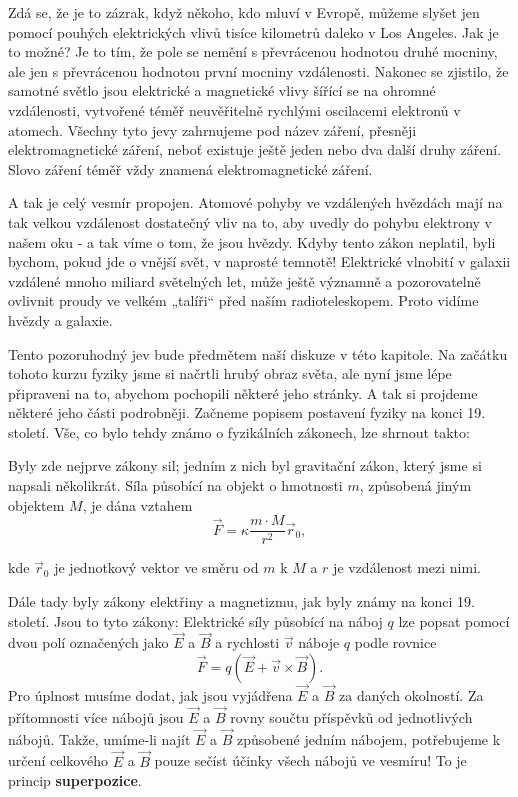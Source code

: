 {    Zdá se, že je to zázrak, když někoho, kdo mluví v Evropě, můžeme slyšet jen pomocí pouhých 
    elektrických vlivů tisíce kilometrů daleko v Los Angeles. Jak je to možné? Je to tím, že pole 
    se nemění s převrácenou hodnotou druhé mocniny, ale jen s převrácenou hodnotou první mocniny 
    vzdálenosti. Nakonec se zjistilo, že samotné světlo jsou elektrické a magnetické vlivy šířící 
    se na ohromné vzdálenosti, vytvořené téměř neuvěřitelně rychlými oscilacemi elektronů v 
    atomech. Všechny tyto jevy zahrnujeme pod název záření, přesněji elektromagnetické záření, 
    neboť existuje ještě jeden nebo dva další druhy záření. Slovo záření téměř vždy znamená 
    elektromagnetické záření.
    
    A tak je celý vesmír propojen. Atomové pohyby ve vzdálených hvězdách mají na tak velkou 
    vzdálenost dostatečný vliv na to, aby uvedly do pohybu elektrony v našem oku - a tak víme o 
    tom, že jsou hvězdy. Kdyby tento zákon neplatil, byli bychom, pokud jde o vnější svět, v 
    naprosté temnotě! Elektrické vlnobití v galaxii vzdálené mnoho miliard světelných let, může 
    ještě významně a pozorovatelně ovlivnit proudy ve velkém „talíři“ před naším radioteleskopem. 
    Proto vidíme hvězdy a galaxie. 
    
    Tento pozoruhodný jev bude předmětem naší diskuze v této kapitole. Na začátku tohoto kurzu 
    fyziky jsme si načrtli hrubý obraz světa, ale nyní jsme lépe připraveni na to, abychom 
    pochopili některé jeho stránky. A tak si projdeme některé jeho části podrobněji. Začneme 
    popisem postavení fyziky na konci 19. století. Vše, co bylo tehdy známo o fyzikálních zákonech, 
    lze shrnout takto: 
    
    Byly zde nejprve zákony sil; jedním z nich byl gravitační zákon, který jsme si napsali 
    několikrát. Síla působící na objekt o hmotnosti \(m\), způsobená jiným objektem \(M\), je dána 
    vztahem
    \begin{equation}\label{fyz:eq296}
      \vec{F} = \kappa\dfrac{m\cdot M}{r^2}\vec{r}_0,
    \end{equation}
    
    kde \(\vec{r}_0\) je jednotkový vektor ve směru od \(m\) k \(M\) a \(r\) je vzdálenost mezi 
    nimi.
    
    Dále tady byly zákony elektřiny a magnetizmu, jak byly známy na konci 19. století. Jsou to tyto 
    zákony: Elektrické síly působící na náboj \(q\) lze popsat pomocí dvou polí označených jako 
    \(\vec{E}\) a \(\vec{B}\) a rychlosti \(\vec{v}\) náboje \(q\) podle rovnice
    \begin{equation}\label{fyz:eq297}
      \vec{F} = q (\vec{E} + \vec{v}\times\vec{B}). 
    \end{equation}
    Pro úplnost musíme dodat, jak jsou vyjádřena \(\vec{E}\) a \(\vec{B}\) za daných okolností. Za 
    přítomnosti více nábojů jsou \(\vec{E}\) a \(\vec{B}\) rovny součtu příspěvků od jednotlivých 
    nábojů. Takže, umíme-li najít \(\vec{E}\) a \(\vec{B}\) způsobené jedním nábojem, potřebujeme k 
    určení celkového \(\vec{E}\) a \(\vec{B}\) pouze sečíst účinky všech nábojů ve vesmíru! To je 
    princip \textbf{superpozice}.
    
}
